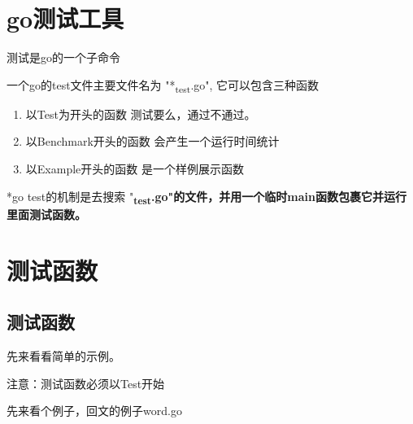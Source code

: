 \hypertarget{goux6d4bux8bd5ux5de5ux5177}{%
\section{go测试工具}\label{goux6d4bux8bd5ux5de5ux5177}}

测试是go的一个子命令

\begin{Shaded}
\begin{Highlighting}[]
\end{Highlighting}
\end{Shaded}

一个go的test文件主要文件名为 "*\textsubscript{test}.go",
它可以包含三种函数

\begin{enumerate}
\tightlist
\item
  以Test为开头的函数 测试要么，通过不通过。
\item
  以Benchmark开头的函数 会产生一个运行时间统计
\item
  以Example开头的函数 是一个样例展示函数
\end{enumerate}

*go test的机制是去搜索
"\textbf{\textsubscript{test}.go"的文件，并用一个临时main函数包裹它并运行里面测试函数。}

\hypertarget{ux6d4bux8bd5ux51fdux6570}{%
\section{测试函数}\label{ux6d4bux8bd5ux51fdux6570}}

\hypertarget{ux6d4bux8bd5ux51fdux6570-1}{%
\subsection{测试函数}\label{ux6d4bux8bd5ux51fdux6570-1}}

先来看看简单的示例。

注意：测试函数必须以Test开始

\begin{Shaded}
\begin{Highlighting}[]
\NormalTok{\}}
\end{Highlighting}
\end{Shaded}

先来看个例子，回文的例子word.go

\begin{Shaded}
\begin{Highlighting}[]
\NormalTok{) }\NormalTok{ \{}
    \NormalTok{ s[i] != s[}\NormalTok{-i] \{}
       
\NormalTok{    \}}
\NormalTok{  \}}
   
\NormalTok{\}}
\end{Highlighting}
\end{Shaded}

